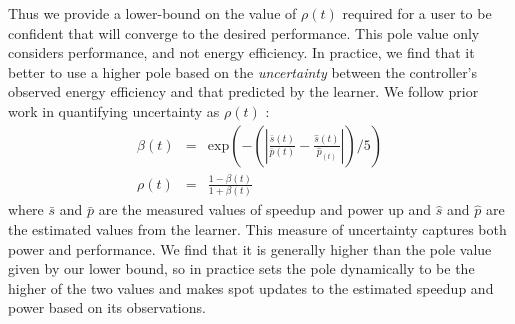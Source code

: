Thus we provide a lower-bound on the value of $\rho(t)$ required for a
user to be confident that \SYSTEM{} will converge to the desired
performance.  This pole value only considers performance, and not
energy efficiency.  In practice, we find that it better to use a
higher pole based on the \emph{uncertainty} between the controller's
observed energy efficiency and that predicted by the learner.  We
follow prior work in quantifying uncertainty as $\rho(t) $
\cite{Tokic2010}:
\begin{equation}
  \begin{array}{rcl}
    \beta(t) &=&  \text{exp}{\left(- \left( \left|   \frac{\bar{s}(t)}{\bar{p}(t)}  -\frac{ \hat{s}(t)}{\hat{p}_(t)} \right| \right) /5\right)} \\
    \rho(t) &=& \frac{1-\beta(t)}{1+\beta(t)} 
  \end{array}
  \label{eqn:uncer}
\end{equation}
where $\bar{s}$ and $\bar{p}$ are the measured values of speedup and
power up and $\hat{s}$ and $\hat{p}$ are the estimated values from the
learner.  This measure of uncertainty captures both power and
performance.  We find that it is generally higher than the pole value
given by our lower bound, so in practice \SYSTEM{} sets the pole
dynamically to be the higher of the two values and \SYSTEM{} makes
spot updates to the estimated speedup and power based on its
observations.
